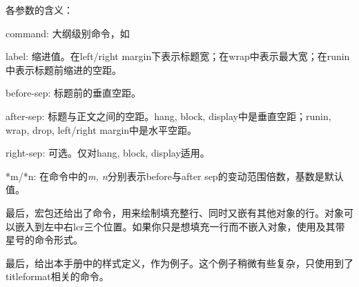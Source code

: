各参数的含义：
\begin{para}
\item[command:] 大纲级别命令，如\latexline{\\chapter}
\item[label:] 缩进值。在left/right margin下表示标题宽；在wrap中表示最大宽；在runin中表示标题前缩进的空距。
\item[before-sep:] 标题前的垂直空距。
\item[after-sep:] 标题与正文之间的空距。hang, block, display中是垂直空距；runin, wrap, drop, left/right margin中是水平空距。
\item[right-sep:] 可选。仅对hang, block, display适用。
\item[*m/*n:] 在\latexline{\\titlespacing}命令中的\textit{m, n}分别表示before与after sep的变动范围倍数，基数是默认值。
\end{para}

最后，宏包还给出了\latexline{\\titleline}命令，用来绘制填充整行、同时又嵌有其他对象的行。对象可以嵌入到左中右lcr三个位置。如果你只是想填充一行而不嵌入对象，使用\latexline{\\titlerule}及其带星号的命令形式。
\begin{latex}{}
\end{latex}

最后，给出本手册中的样式定义，作为例子。这个例子稍微有些复杂，只使用到了titleformat相关的命令。
\begin{latex}{}
\newcommand{\chaformat}[1]{%
	\parbox[b]{.5\textwidth}{\hfill\bfseries #1}%
	\quad\rule[-12pt]{2pt}{70pt}\quad
	{\fontsize{60}{60}\selectfont\thechapter}}
\titleformat{\chapter}[block]{\hfill\LARGE\sffamily}
    {}{0pt}{\chaformat}[\vspace{2.5pc}\large
	\startcontents\printcontents{}{1}
	{\setcounter{tocdepth}{2}}]
\titleformat*{\section}{\centering\Large\bfseries}
\titleformat{\subsubsection}[hang]
    {\bfseries\large}{\rule{1.5ex}{1.5ex}{0.5em}{}
\end{latex}

